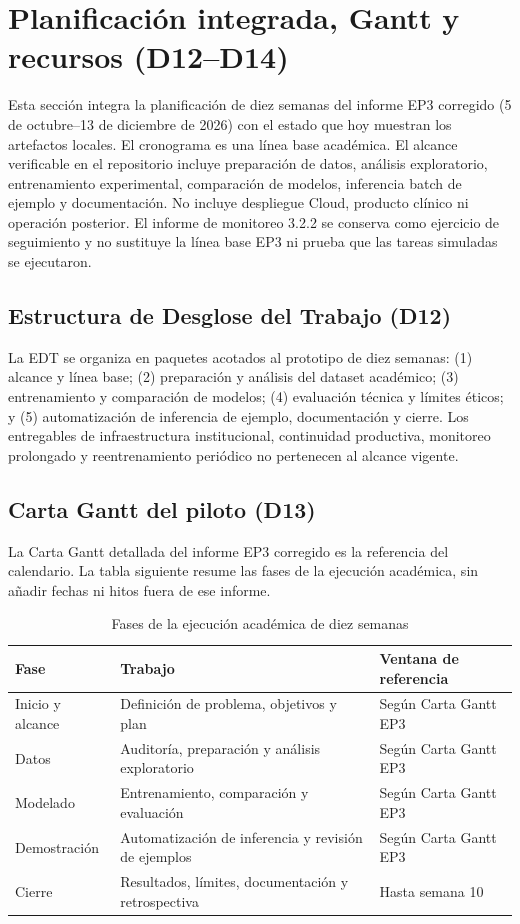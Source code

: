 \section{Planificación integrada, Gantt y recursos (D12--D14)}

Esta sección integra la planificación de diez semanas del informe EP3 corregido (5 de octubre–13 de diciembre de 2026) con el estado que hoy muestran los artefactos locales. El cronograma es una línea base académica. El alcance verificable en el repositorio incluye preparación de datos, análisis exploratorio, entrenamiento experimental, comparación de modelos, inferencia batch de ejemplo y documentación. No incluye despliegue Cloud, producto clínico ni operación posterior. El informe de monitoreo 3.2.2 se conserva como ejercicio de seguimiento y no sustituye la línea base EP3 ni prueba que las tareas simuladas se ejecutaron.

\subsection{Estructura de Desglose del Trabajo (D12)}

La EDT se organiza en paquetes acotados al prototipo de diez semanas: (1) alcance y línea base; (2) preparación y análisis del dataset académico; (3) entrenamiento y comparación de modelos; (4) evaluación técnica y límites éticos; y (5) automatización de inferencia de ejemplo, documentación y cierre. Los entregables de infraestructura institucional, continuidad productiva, monitoreo prolongado y reentrenamiento periódico no pertenecen al alcance vigente.

\subsection{Carta Gantt del piloto (D13)}

La Carta Gantt detallada del informe EP3 corregido es la referencia del calendario. La tabla siguiente resume las fases de la ejecución académica, sin añadir fechas ni hitos fuera de ese informe.

\begin{table}[H]
  \centering
  \caption{Fases de la ejecución académica de diez semanas}
  \label{tab:gantt-piloto}
  \scriptsize
  \begin{tabularx}{\textwidth}{@{}p{2.2cm}X p{3.2cm}@{}}
    \toprule
    Fase & Trabajo & Ventana de referencia \\
    \midrule
    Inicio y alcance & Definición de problema, objetivos y plan & Según Carta Gantt EP3 \\
    Datos & Auditoría, preparación y análisis exploratorio & Según Carta Gantt EP3 \\
    Modelado & Entrenamiento, comparación y evaluación & Según Carta Gantt EP3 \\
    Demostración & Automatización de inferencia y revisión de ejemplos & Según Carta Gantt EP3 \\
    Cierre & Resultados, límites, documentación y retrospectiva & Hasta semana 10 \\
    \bottomrule
  \end{tabularx}
\end{table}

